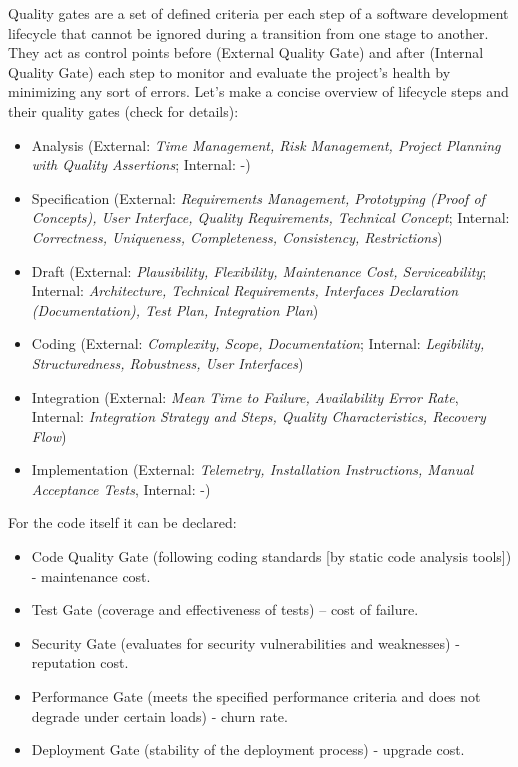 
Quality gates are a set of defined criteria per each step of a software development lifecycle that cannot be
ignored during a transition from one stage to another. They act as control points before (External Quality Gate) and 
after (Internal Quality Gate) each step to monitor and evaluate the project's health by minimizing any sort of errors.
Let's make a concise overview of lifecycle steps and their quality gates (check \cite{Hawl02} for details):

\begin{itemize}
  \item Analysis (External: \emph{Time Management, Risk Management, Project Planning with Quality Assertions}; 
  Internal: -)

  \item Specification (External: \emph{Requirements Management, Prototyping (Proof of Concepts), User Interface, 
  Quality Requirements, Technical Concept}; Internal: \emph{Correctness, Uniqueness, Completeness, Consistency, 
  Restrictions})

  \item Draft (External: \emph{Plausibility, Flexibility, Maintenance Cost, Serviceability}; Internal: 
  \emph{Architecture, Technical Requirements, Interfaces Declaration (Documentation), Test Plan, Integration Plan}) 

  \item Coding (External: \emph{Complexity, Scope, Documentation}; Internal: \emph{Legibility, Structuredness, 
  Robustness, User Interfaces})

  \item Integration (External: \emph{Mean Time to Failure, Availability Error Rate}, Internal: \emph{Integration 
  Strategy and Steps, Quality Characteristics, Recovery Flow})

  \item Implementation (External: \emph{Telemetry, Installation Instructions, Manual Acceptance Tests}, Internal: -)
\end{itemize}

\noindent For the code itself it can be declared: 

\begin{itemize}
  \item Code Quality Gate (following coding standards [by static code analysis tools]) - maintenance cost.
  \item Test Gate (coverage and effectiveness of tests) -- cost of failure.
  \item Security Gate (evaluates for security vulnerabilities and weaknesses) - reputation cost.
  \item Performance Gate (meets the specified performance criteria and does not degrade under certain loads) - churn rate.
  \item Deployment Gate (stability of the deployment process) - upgrade cost.
\end{itemize}

